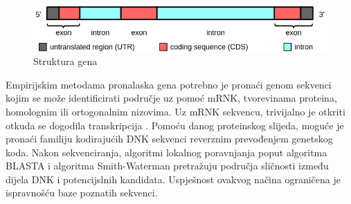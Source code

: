 \documentclass[times, utf8, zavrsni, numeric]{fer}
\begin{document}
\begin{figure}[htb]
	\includegraphics[width=\linewidth]{slike/genePrediction.PNG}
	\centering
	\caption{Struktura gena \cite{wikiGen}}
	\label{fig:strukturaGena}
\end{figure}

Empirijskim metodama pronalaska gena potrebno je pronaći genom sekvenci kojim se može identificirati područje uz pomoć mRNK, tvorevinama proteina, homolognim ili ortogonalnim nizovima. Uz mRNK sekvencu, trivijalno je otkriti otkuda se dogodila transkripcija \cite{applicationOfBioinformatics}. Pomoću danog proteinskog slijeda, moguće je pronaći familiju kodirajućih DNK sekvenci reverznim prevođenjem genetskog koda. Nakon sekvenciranja, algoritmi lokalnog poravnjanja poput algoritma BLASTA i algoritma Smith-Waterman pretražuju područja sličnosti između dijela DNK i potencijslnih kandidata. Uspješnost ovakvog načina ograničena je ispravnošću baze poznatih sekvenci. 
\end{document}
